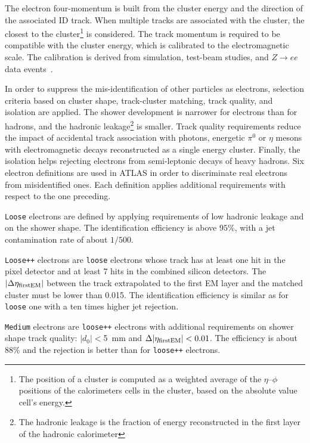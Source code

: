 The electron four-momentum is built from the cluster energy
and the direction of the associated ID track.
When multiple tracks are associated with the cluster, the closest
to the cluster\footnote{The position of a cluster 
is computed as a weighted average of the $\eta$--$\phi$ positions 
of the calorimeters cells in the cluster, based on the absolute 
value cell's energy.} is considered.
The track momentum is required to be compatible with the cluster energy,
which is calibrated to the electromagnetic scale. The calibration is
derived from simulation, test-beam studies, and $Z\to ee$ data 
events~\cite{elecalib}.

In order to suppress the mis-identification of other particles  
as electrons, selection criteria based on cluster shape, 
track-cluster matching, track quality, and isolation are applied.
The shower development is narrower for electrons than for hadrons, and
the hadronic leakage\footnote{The hadronic leakage is the fraction of 
energy reconstructed in the first layer of the hadronic calorimeter}
is smaller. Track quality requirements reduce the impact of accidental 
track association with photons, energetic $\pi^0$ or $\eta$ mesons
with electromagnetic decays reconstructed as a single energy cluster.
Finally, the isolation helps rejecting electrons from semi-leptonic
decays of  heavy hadrons.
Six electron definitions are used in ATLAS in order to discriminate
real electrons from misidentified ones. Each definition applies
additional requirements with respect to the one preceding.

\texttt{Loose} electrons are defined by applying requirements of low
hadronic leakage and on the shower shape.
The identification efficiency is above $95\%$, with a jet
contamination rate of about $1/500$.

\texttt{Loose++} electrons are \texttt{loose} electrons whose track
has at least one hit in  the pixel detector and at least 7 hits in the
combined silicon detectors. The $|\Delta\eta_{\rm first EM}|$ between
the track extrapolated to the first EM layer and the matched cluster
must be lower than 0.015. The identification efficiency is similar as
for \texttt{loose} one with a ten times higher jet rejection. 

\texttt{Medium} electrons are \texttt{loose++} electrons with
additional requirements on shower shape track quality: $|d_0|<$5~mm
and $\Delta|\eta_{\rm first EM}|<0.01$. The efficiency is about 88\%
and the rejection is better than for \texttt{loose++} electrons.

